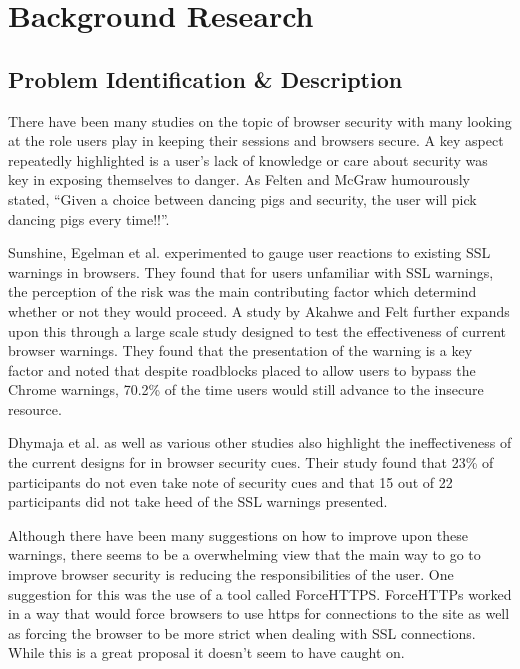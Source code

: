 \documentclass{mpaper}
\begin{document}
\section{Background Research}
\subsection{Problem Identification \& Description}

There have been many studies on the topic of browser security with many looking at the role users play in keeping their sessions and browsers secure. A key aspect repeatedly highlighted is a user's lack of knowledge or care about security was key in exposing themselves to danger. As Felten and McGraw humourously stated, ``Given a choice between dancing pigs and security, the user will pick dancing pigs every time!!''.\cite{dancingpigs}

Sunshine, Egelman et al\cite{Sunshine09cryingwolf}. experimented to gauge user reactions to existing SSL warnings in browsers. They found that for users unfamiliar with SSL warnings, the perception of the risk was the main contributing factor which determind whether or not they would proceed. A study by Akahwe and Felt\cite{WarningLand} further expands upon this through a large scale study designed to test the effectiveness of current browser warnings. They found that the presentation of the warning is a key factor and noted that despite roadblocks placed to allow users to bypass the Chrome warnings, 70.2\% of the time users would still advance to the insecure resource. 

Dhymaja et al.\cite{whyphish} as well as various other studies\cite{emperors} \cite{Gathering} \cite{warned} also highlight the ineffectiveness of the current designs for in browser security cues. Their study found that 23\% of participants do not even take note of security cues and that 15 out of 22 participants did not take heed of the SSL warnings presented.

Although there have been many suggestions on how to improve upon these warnings, there seems to be a overwhelming view that the main way to go to improve browser security is reducing the responsibilities of the user. One suggestion for this was the use of a tool called ForceHTTPS\cite{Jackson08forcehttps:protecting}. ForceHTTPs worked in a way that would force browsers to use https for connections to the site as well as forcing the browser to be more strict when dealing with SSL connections. While this is a great proposal it doesn't seem to have caught on.
\end{document}
